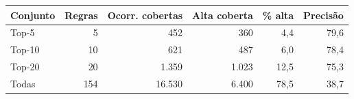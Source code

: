 \begin{tabular}{@{}lrrrrr@{}}
\toprule
\textbf{Conjunto} & \textbf{Regras} & \textbf{Ocorr. cobertas} & \textbf{Alta coberta} & \textbf{\% alta} & \textbf{Precis\~ao} \\
\midrule
Top-5 & 5 & 452 & 360 & 4,4 & 79,6 \\
Top-10 & 10 & 621 & 487 & 6,0 & 78,4 \\
Top-20 & 20 & 1.359 & 1.023 & 12,5 & 75,3 \\
Todas & 154 & 16.530 & 6.400 & 78,5 & 38,7 \\
\bottomrule
\end{tabular}